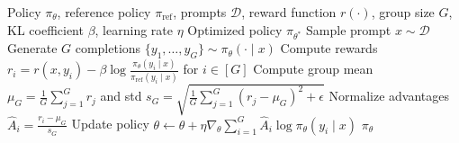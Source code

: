 \documentclass[12pt,a4paper]{report}
\theoremstyle{definition}
\newcommand{\source}[1]{\vspace{-0.5\baselineskip}\caption*{\small Source: #1}}
\begin{document}
\begin{algorithm}[htbp]
\caption{Group Relative Policy Optimization (GRPO) algorithm. Unlike PPO, GRPO normalizes advantages within each group of completions, \textbf{eliminating the need for a separate value/critic network}. A reward signal $r(\cdot)$ is still required---this can be verifiable/programmatic or from a learned reward model.}
\label{alg:grpo}
\small
\begin{algorithmic}[1]
\Require Policy $\pi_\theta$, reference policy $\pi_{\text{ref}}$, prompts $\mathcal{D}$, reward function $r(\cdot)$, group size $G$, KL coefficient $\beta$, learning rate $\eta$
\Ensure Optimized policy $\pi_{\theta^*}$
    \State Sample prompt $x \sim \mathcal{D}$
    \State Generate $G$ completions $\{y_1, \ldots, y_G\} \sim \pi_\theta(\cdot \mid x)$
    \State Compute rewards $r_i = r(x, y_i) - \beta \log \frac{\pi_\theta(y_i \mid x)}{\pi_{\text{ref}}(y_i \mid x)}$ for $i \in [G]$ 
    \State Compute group mean $\mu_G = \frac{1}{G}\sum_{j=1}^{G} r_j$ and std $s_G = \sqrt{\frac{1}{G}\sum_{j=1}^{G}(r_j - \mu_G)^2 + \epsilon}$
    \State Normalize advantages $\hat{A}_i = \frac{r_i - \mu_G}{s_G}$ 
    \State Update policy $\theta \leftarrow \theta + \eta \nabla_\theta \sum_{i=1}^{G} \hat{A}_i \log \pi_\theta(y_i \mid x)$
\EndFor
\State \Return $\pi_\theta$
\end{algorithmic}
\source{Adapted from DeepSeek-Math~\cite{shao2024deepseekmath} and DeepSeek-R1~\cite{deepseek2025r1}}
\end{algorithm}
\end{document}
